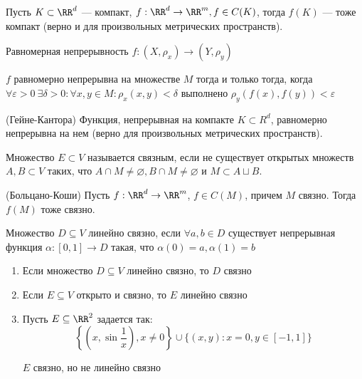 \begin{thrm}{}{}
    Пусть \( K \subset \RR^d \) --- компакт, \( f : \RR^d \to \RR^m, f \in C(K) \),
    тогда \( f(K) \) --- тоже компакт (верно и для произвольных метрических пространств).
\end{thrm}

\begin{defn}{Равномерная непрерывность}{}
    \( f : (X, \rho_x) \to (Y, \rho_y) \)

    \( f \) равномерно непрерывна на множестве \( M \) тогда и только тогда,
    когда \( \forall \varepsilon > 0 \: \exists \delta > 0 : \forall x, y \in M : \rho_x(x, y) < \delta \)
    выполнено \( \rho_y (f(x), f(y)) < \varepsilon \)
\end{defn}

\begin{thrm}{(Гейне-Кантора)}{}
    Функция, непрерывная на компакте \( K \subset R^d \), равномерно непрерывна на нем
    (верно для произвольных метрических пространств).
\end{thrm}

\begin{defn}{}{}
    Множество \( E \subset V \) называется связным,
    если не существует открытых множеств \( A, B \subset V \) таких,
    что \( A \cap M \neq \varnothing, B \cap M \neq \varnothing \) и \( M \subset A \sqcup B \).
\end{defn}

\begin{thrm}{(Больцано-Коши)}{}
    Пусть \( f : \RR^d \to \RR^m \), \( f \in C(M) \), причем \( M \) связно.
    Тогда \( f(M) \) тоже связно.
\end{thrm}

\begin{defn}{}{}
    Множество \( D \subseteq V \) линейно связно,
    если \( \forall a, b \in D \) существует непрерывная функция \( \alpha : [0, 1] \to D \)
    такая, что \( \alpha(0) = a, \alpha(1) = b \)
\end{defn}

\begin{exercise}{}{}
    \begin{enumerate}
        \item
            Если множество \( D \subseteq V \) линейно связно, то \( D \) связно
        \item
            Если \( E \subseteq V \) открыто и связно, то \( E \) линейно связно
        \item
            Пусть \( E \subseteq \RR^2 \) задается так:
            \[
                \left\{ \left( x, \sin \frac{1}{x} \right), x \neq 0 \right\} \cup \{ (x, y) : x = 0, y \in [-1, 1] \}
            \]

            \( E \) связно, но не линейно связно
    \end{enumerate}
\end{exercise}

